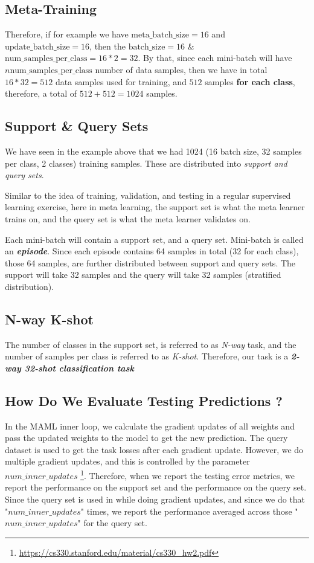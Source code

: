 \documentclass{article}
\begin{document}
\subsection*{Meta-Training}
\noindent Therefore, if for example we have $\text{meta\_batch\_size} = 16$ and $\text{update\_batch\_size}=16$, then the $\text{batch\_ size} = 16 $ \& $\text{num\_samples\_per\_class} = 16 * 2 = 32$. By that, since each mini-batch will have $n\text{num\_samples\_per\_class}$ number of data samples, then we have in total $16 * 32 = 512$ data samples used for training, and $512$ samples \textbf{for each class}, therefore, a total of $512 + 512 = 1024$ samples.

\subsection*{Support \& Query Sets}
We have seen in the example above that we had 1024 (16 batch size, 32 samples per class, 2 classes) training samples. These are distributed into \textit{support and query sets}. 

\noindent Similar to the idea of training, validation, and testing in a regular supervised learning exercise, here in meta learning, the support set is what the meta learner trains on, and the query set is what the meta learner validates on.

\noindent Each mini-batch will contain a support set, and a query set. Mini-batch is called an \textbf{\textit{episode}}. Since each episode contains 64 samples in total (32 for each class), those 64 samples, are further distributed between support and query sets. The support will take 32 samples and the query will take 32 samples (stratified distribution).

\subsection*{N-way K-shot}
The number of classes in the support set, is referred to as \textit{N-way} task, and the number of samples per class is referred to as \textit{K-shot}. Therefore, our task is a \textit{\textbf{2-way 32-shot classification task}} 


\subsection*{How Do We Evaluate Testing Predictions ?}
In the MAML inner loop, we calculate the gradient updates of all weights and pass the updated weights to the model to get the new prediction. The query dataset is used to get the task losses after each gradient update. However, we do multiple gradient updates, and this is controlled by the parameter $num\_inner\_updates$ \footnote{\url{https://cs330.stanford.edu/material/cs330_hw2.pdf}}. Therefore, when we report the testing error metrics, we report the performance on the support set and the performance on the query set. Since the query set is used in while doing gradient updates, and since we do that "$num\_inner\_updates$" times, we report the performance averaged across those "$num\_inner\_updates$" for the query set. 
\end{document}
